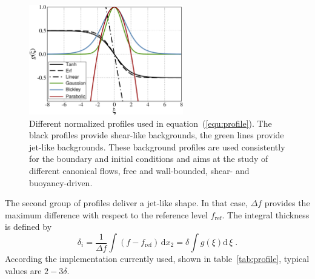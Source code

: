 \begin{figure}
\includegraphics[clip,width=0.6\textwidth]{figs/Profiles}
\caption{Different normalized profiles used in equation~(\ref{equ:profile}). The
  black profiles provide shear-like backgrounds, the green lines provide
  jet-like backgrounds. These background profiles are used consistently for the
  boundary and initial conditions and aims at the study of different canonical
  flows, free and wall-bounded, shear- and buoyancy-driven.}\label{fig:profile}
\end{figure}

The second group of profiles deliver a jet-like shape. In that case, $\Delta f$
provides the maximum difference with respect to the reference level
$f_\text{ref}$. The integral thickness is defined by
\begin{equation}
  \delta_i =\frac{1}{\Delta f}\int\! (f-f_\text{ref})\,\mathrm{d} x_2 
  = \delta\int\! g(\xi)\mathrm{d}\,\xi \;.
\label{equ:deltai}
\end{equation}
According the implementation currently used, shown in table~\ref{tab:profile},
typical values are $2-3\delta$.

